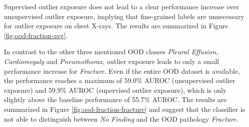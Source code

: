 Supervised outlier exposure does not lead to a clear performance increase over unsupervised outlier exposure, implying that fine-grained labels are unnecessary for outlier exposure on chest X-rays.
The results are summarized in Figure \ref{fig:ood-fraction-avg}.
\par
In contrast to the other three mentioned OOD classes \textit{Pleural Effusion}, \textit{Cardiomegaly} and \textit{Pneumothorax}, outlier exposure leads to only a small performance increase for \textit{Fracture}.
Even if the entire OOD dataset is available, the performance reaches a maximum of 59.0\% AUROC (unsupervised outlier exposure) and 59.9\% AUROC (supervised outlier exposure), which is only slightly above the baseline performance of 55.7\% AUROC.
The results are summarized in Figure \ref{fig:ood-fraction-fracture} and suggest that the classifier is not able to distinguish between \textit{No Finding} and the OOD pathology \textit{Fracture}.